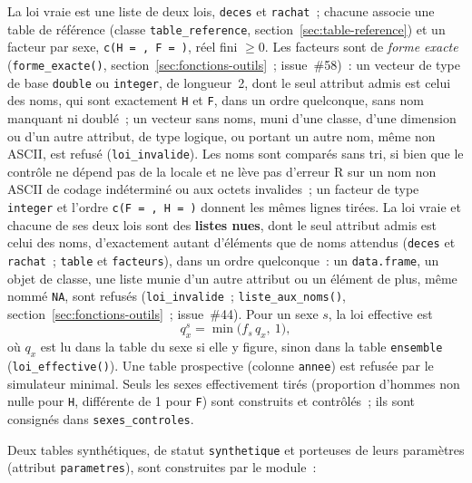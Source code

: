\documentclass[a4paper,11pt]{article}
\newcommand{\code}[1]{\texttt{\small #1}}
\begin{document}
La loi vraie est une liste de deux lois, \code{deces} et \code{rachat}~;
chacune associe une table de référence (classe \code{table\_reference},
section~\ref{sec:table-reference}) et un facteur par sexe, \code{c(H = , F = )},
réel fini $\ge 0$. Les facteurs sont de \emph{forme exacte}
(\code{forme\_exacte()}, section~\ref{sec:fonctions-outils}~; issue~\#58)~:
un vecteur de type de base \code{double} ou \code{integer}, de longueur~2,
dont le seul attribut admis est celui des noms, qui sont exactement
\code{H} et \code{F}, dans un ordre quelconque, sans nom manquant ni
doublé~; un vecteur sans noms, muni d'une classe, d'une dimension ou d'un
autre attribut, de type logique, ou portant un autre nom, même non ASCII,
est refusé (\code{loi\_invalide}). Les noms sont comparés sans tri, si bien
que le contrôle ne dépend pas de la locale et ne lève pas d'erreur R sur un
nom non ASCII de codage indéterminé ou aux octets invalides~; un facteur
de type \code{integer} et l'ordre \code{c(F = , H = )} donnent les mêmes
lignes tirées. La loi vraie et chacune de ses deux lois sont des
\textbf{listes nues}, dont le seul attribut admis est celui des noms,
d'exactement autant d'éléments que de noms attendus (\code{deces} et
\code{rachat}~; \code{table} et \code{facteurs}), dans un ordre
quelconque~: un \code{data.frame}, un objet de classe, une liste munie d'un
autre attribut ou un élément de plus, même nommé \code{NA}, sont refusés
(\code{loi\_invalide}~; \code{liste\_aux\_noms()},
section~\ref{sec:fonctions-outils}~; issue~\#44). Pour un sexe $s$, la loi effective est
\[
  q^{s}_x = \min\bigl(f_s\, q_x,\ 1\bigr),
\]
où $q_x$ est lu dans la table du sexe si elle y figure, sinon dans la table
\code{ensemble} (\code{loi\_effective()}). Une table prospective (colonne
\code{annee}) est refusée par le simulateur minimal. Seuls les sexes
effectivement tirés (proportion d'hommes non nulle pour \code{H}, différente
de 1 pour \code{F}) sont construits et contrôlés~; ils sont consignés dans
\code{sexes\_controles}.

\medskip
Deux tables synthétiques, de statut \code{synthetique} et porteuses de leurs
paramètres (attribut \code{parametres}), sont construites par le module~:
\end{document}
